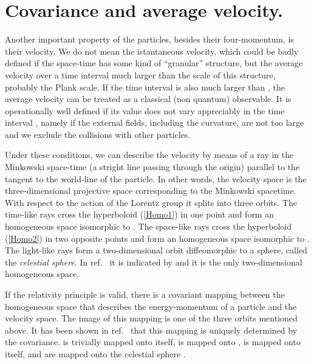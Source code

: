 \documentclass[a4paper,12pt]{article}
\begin{document}
\section{Covariance and average velocity.}

Another important property of the particles, besides their four-momentum, is their velocity. We do not mean the istantaneous velocity, which could be badly defined if the space-time has some kind of ``granular'' structure, but the average velocity over a time interval \coordHE{} much larger than the scale \coordHE{} of this structure, probably the Plank scale. If the time interval \coordHE{} is also much larger than \coordHE{}, the average velocity can be treated as a classical (non quantum) observable. It is operationally well defined if its value does not vary appreciably in the time interval \coordHE{}, namely if the external fields, including the curvature, are not too large and we exclude the collisions with other particles.

Under these conditions, we can describe the velocity by means of a ray in the Minkowski space-time (a stright line passing through the origin) parallel to the tangent to the world-line of the particle. In other words, the velocity space is the three-dimensional projective space corresponding to the Minkowski spacetime. With respect to the action of the Lorentz group it splits into three orbits. The time-like rays cross the hyperboloid (\ref{Homo1}) in one point and form an homogeneous space isomorphic to \coordHE{}. The space-like rays cross the hyperboloid (\ref{Homo2}) in two opposite points and form an homogeneous space isomorphic to \coordHE{}. The light-like rays form a two-dimensional orbit diffeomorphic to a sphere, called the {\it celestial sphere}. In ref.\ \cite{Toller1} it is indicated by \coordHE{} and it is the only two-dimensional homogeneous space.

If the relativity principle is valid, there is a covariant mapping between the homogeneous space that describes the energy-momentum of a particle and the velocity space. The image of this mapping is one of the three orbits mentioned above. It has been shown in ref.\ \cite{Toller1} that this mapping is uniquely determined by the covariance. \coordHE{} is trivially mapped onto itself, \coordHE{} is mapped onto \coordHE{}, \coordHE{} is mapped onto itself, \coordHE{} and \coordHE{} are mapped onto the celestial sphere  \coordHE{}. 
\end{document}
